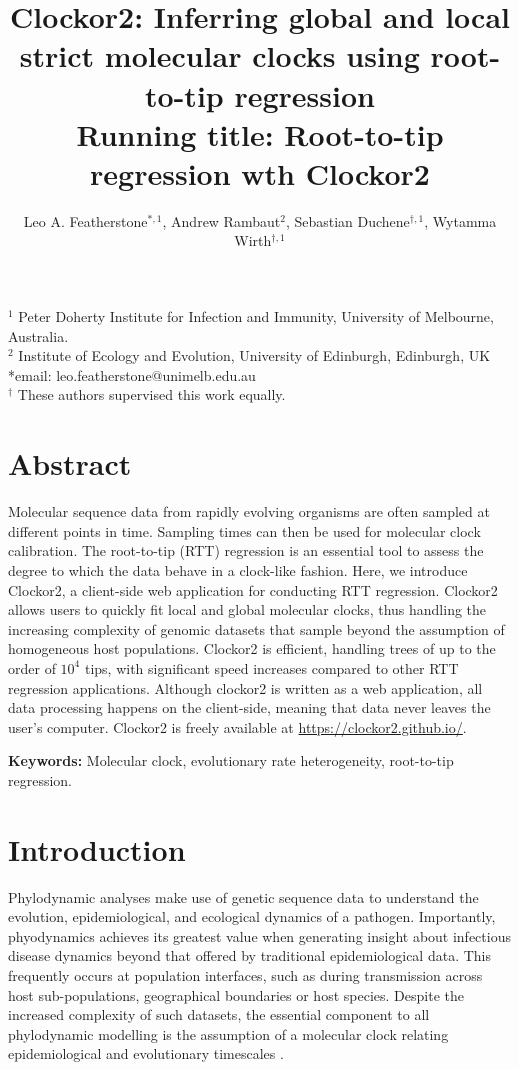 \documentclass{article}
\title{Clockor2:  Inferring global and local strict molecular clocks using root-to-tip regression \\ \large Running title: Root-to-tip regression wth Clockor2}
\author{Leo A. Featherstone$^{\ast,1}$, Andrew Rambaut$^{2}$, Sebastian Duchene$^{\dagger,1}$, Wytamma Wirth$^{\dagger,1}$\\}
\date{}
\begin{document}
\maketitle

$^{1}$ Peter Doherty Institute for Infection and Immunity, University of Melbourne, Australia.\\
$^{2}$ Institute of Ecology and Evolution, University of Edinburgh, Edinburgh, UK\\
*email: leo.featherstone@unimelb.edu.au\\
$^{\dagger}$ These authors supervised this work equally.

\linenumbers
\section*{Abstract}
Molecular sequence data from rapidly evolving organisms are often sampled at different points in time. Sampling times can then be used for molecular clock calibration. The root-to-tip (RTT) regression is an essential tool to assess the degree to which the data behave in a clock-like fashion. Here, we introduce Clockor2, a client-side web application for conducting RTT regression. Clockor2 allows users to quickly fit local and global molecular clocks, thus handling the increasing complexity of genomic datasets that sample beyond the assumption of homogeneous host populations. Clockor2 is efficient, handling trees of up to the order of $10^4$ tips, with significant speed increases compared to other RTT regression applications. Although clockor2 is written as a web application, all data processing happens on the client-side, meaning that data never leaves the user's computer. Clockor2 is freely available at \url{https://clockor2.github.io/}.

\textbf{Keywords:} Molecular clock, evolutionary rate heterogeneity, root-to-tip regression.

\section*{Introduction}
Phylodynamic analyses make use of genetic sequence data to understand the evolution, epidemiological, and ecological dynamics of a pathogen. Importantly, phyodynamics achieves its greatest value when generating insight about infectious disease dynamics beyond that offered by traditional epidemiological data. This frequently occurs at population interfaces, such as during transmission across host sub-populations,  geographical boundaries or host species. Despite the increased complexity of such datasets, the essential component to all phylodynamic modelling is the assumption of a molecular clock relating epidemiological and evolutionary timescales \citep{biek_measurably_2015}.
\end{document}
